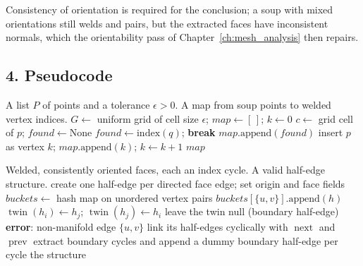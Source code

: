 Consistency of orientation is required for the conclusion; a soup with
mixed orientations still welds and pairs, but the extracted faces have
inconsistent normals, which the orientability pass of
Chapter~\ref{ch:mesh_analysis} then repairs.

\subsection{4. Pseudocode}

\begin{algorithm}[htbp]
\caption{Weld Polygon-Soup Vertices}
\label{alg:hed_vertex_weld}
\begin{algorithmic}[1]
\Require A list $P$ of points and a tolerance $\epsilon > 0$.
\Ensure A map from soup points to welded vertex indices.
  \State $G \gets$ uniform grid of cell size $\epsilon$; $\mathit{map} \gets [\,]$; $k \gets 0$
    \State $c \gets$ grid cell of $p$; $\mathit{found} \gets \text{None}$
        \State $\mathit{found} \gets \text{index}(q)$; \textbf{break}
      \EndIf
    \EndFor
      \State $\mathit{map}.\text{append}(\mathit{found})$
    \Else
      \State insert $p$ as vertex $k$; $\mathit{map}.\text{append}(k)$; $k \gets k + 1$
    \EndIf
  \EndFor
  \State \Return $\mathit{map}$
\EndFunction
\end{algorithmic}
\end{algorithm}

\begin{algorithm}[htbp]
\caption{Build Half-Edge Structure from a Polygon Soup}
\label{alg:hed_build_dcel}
\begin{algorithmic}[1]
\Require Welded, consistently oriented faces, each an index cycle.
\Ensure A valid half-edge structure.
  \State create one half-edge per directed face edge; set origin and face fields
  \State $\mathit{buckets} \gets$ hash map on unordered vertex pairs
    \State $\mathit{buckets}[\{u,v\}].\text{append}(h)$
  \EndFor
      \State $\operatorname{twin}(h_i) \gets h_j$; $\operatorname{twin}(h_j) \gets h_i$
      \State leave the twin null (boundary half-edge)
    \Else
      \State \textbf{error}: non-manifold edge $\{u,v\}$
    \EndIf
  \EndFor
    \State link its half-edges cyclically with $\operatorname{next}$ and $\operatorname{prev}$
  \EndFor
  \State extract boundary cycles and append a dummy boundary half-edge per cycle 
  \State \Return the structure
\EndFunction
\end{algorithmic}
\end{algorithm}

